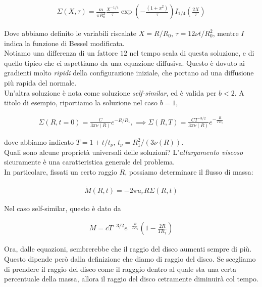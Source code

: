 \documentclass{report}
\begin{document}
\begin{align}
    \Sigma(X, \tau) = \frac{m}{\pi R_0^2}\frac{X^{-1/4}}{\tau}\exp\left(-\frac{(1+x^2)}{\tau} \right)I_{1/4}\left(\frac{2X}{\tau}\right)
\end{align}

Dove abbiamo definito le variabili riscalate \(X = R/R_0\), \(\tau = 12\nu t/R_0^2\), mentre \(I\) indica la funzione di Bessel modificata.\\

Notiamo una differenza di un fattore \(12\) nel tempo scala di questa soluzione, e di quello tipico che ci aspettiamo da una equazione diffusiva. Questo è dovuto ai gradienti molto \emph{ripidi} della configurazione iniziale, che portano ad una diffusione più rapida del normale. \\

Un'altra soluzione è nota come soluzione \emph{self-similar}, ed è valida per \(b<2\). A titolo di esempio, riportiamo la soluzione nel caso \(b=1\), 

\begin{align}
    \Sigma(R, t=0) = \frac{C}{3\pi \nu(R)}e^{-R/R_1}, \implies \Sigma(R, T) = \frac{CT^{-3/2}}{3\pi \nu(R)}e^{-\frac{R}{TR_1}}
\end{align}

dove abbiamo indicato \(T = 1+ t/t_\nu\), \(t_\nu = R_1^2/(3\nu(R))\).  \\

Quali sono alcune proprietà universali delle soluzioni? L'\emph{allargamento viscoso} sicuramente è una caratteristica generale del problema. \\

In particolare, fissati un certo raggio \(R\), possiamo determinare il flusso di massa: 

\begin{align}
    \dot{M}(R, t) = -2\pi u_r R \Sigma(R, t)
\end{align}

Nel caso self-similar, questo è dato da 

\begin{align}
    \dot{M} = cT^{-3/2}e^{-\frac{R}{TR_1}}\left(1- \frac{2R}{TR_1} \right)
\end{align}

Ora, dalle equazioni, sembrerebbe che il raggio del disco aumenti sempre di più. Questo dipende però dalla definizione che diamo di raggio del disco. Se scegliamo di prendere il raggio del disco come il ragggio dentro al quale sta una certa percentuale della massa, allora il raggio del disco cetramente diminuirà col tempo. 
\end{document}
